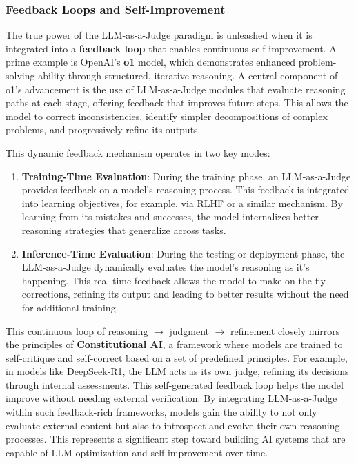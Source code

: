 \documentclass[acmsmall,screen]{acmart}
\begin{document}
\subsubsection{\textbf{Feedback Loops and Self-Improvement}}

The true power of the LLM-as-a-Judge paradigm is unleashed when it is integrated into a \textbf{feedback loop} that enables continuous self-improvement. A prime example is OpenAI's \textbf{o1} model, which demonstrates enhanced problem-solving ability through structured, iterative reasoning. A central component of o1's advancement is the use of LLM-as-a-Judge modules that evaluate reasoning paths at each stage, offering feedback that improves future steps. This allows the model to correct inconsistencies, identify simpler decompositions of complex problems, and progressively refine its outputs.

This dynamic feedback mechanism operates in two key modes:
\begin{enumerate}
\item \textbf{Training-Time Evaluation}: During the training phase, an LLM-as-a-Judge provides feedback on a model's reasoning process. This feedback is integrated into learning objectives, for example, via RLHF or a similar mechanism. By learning from its mistakes and successes, the model internalizes better reasoning strategies that generalize across tasks.
\item \textbf{Inference-Time Evaluation}: During the testing or deployment phase, the LLM-as-a-Judge dynamically evaluates the model's reasoning as it's happening. This real-time feedback allows the model to make on-the-fly corrections, refining its output and leading to better results without the need for additional training.
\end{enumerate}
This continuous loop of reasoning $\rightarrow$ judgment $\rightarrow$ refinement closely mirrors the principles of \textbf{Constitutional AI}, a framework where models are trained to self-critique and self-correct based on a set of predefined principles. For example, in models like DeepSeek-R1, the LLM acts as its own judge, refining its decisions through internal assessments. This self-generated feedback loop helps the model improve without needing external verification. By integrating LLM-as-a-Judge within such feedback-rich frameworks, models gain the ability to not only evaluate external content but also to introspect and evolve their own reasoning processes. This represents a significant step toward building AI systems that are capable of LLM optimization and self-improvement over time.
\end{document}
